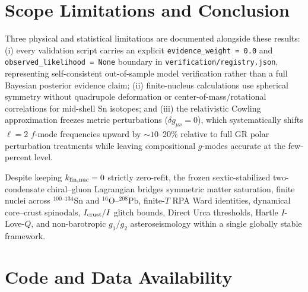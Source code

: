 \documentclass[aps,prc,twocolumn,superscriptaddress,nofootinbib,floatfix]{revtex4-2}
\begin{document}
\begin{itemize}
\end{itemize}

\section{Scope Limitations and Conclusion}\label{sec:conc}

Three physical and statistical limitations are documented alongside these results: (i) every validation script carries an explicit \texttt{evidence\_weight = 0.0} and \texttt{observed\_likelihood = None} boundary in \texttt{verification/registry.json}, representing self-consistent out-of-sample model verification rather than a full Bayesian posterior evidence claim; (ii) finite-nucleus calculations use spherical symmetry without quadrupole deformation or center-of-mass/rotational correlations for mid-shell Sn isotopes; and (iii) the relativistic Cowling approximation freezes metric perturbations ($\delta g_{\mu\nu} = 0$), which systematically shifts $\ell=2$ $f$-mode frequencies upward by $\sim 10\text{--}20\%$ relative to full GR polar perturbation treatments while leaving compositional $g$-modes accurate at the few-percent level.

Despite keeping $k_{\rm fin,nuc} = 0$ strictly zero-refit, the frozen sextic-stabilized two-condensate chiral--gluon Lagrangian bridges symmetric matter saturation, finite nuclei across $^{100\text{--}134}\mathrm{Sn}$ and $^{16}\mathrm{O}\text{--}^{208}\mathrm{Pb}$, finite-$T$ RPA Ward identities, dynamical core--crust spinodals, $I_{\rm crust}/I$ glitch bounds, Direct Urca thresholds, Hartle $I$-Love-$Q$, and non-barotropic $g_1/g_2$ asteroseismology within a single globally stable framework.

\section*{Code and Data Availability}
\end{document}
